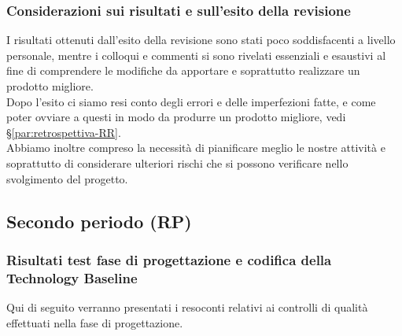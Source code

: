 \documentclass[../piano_di_qualifica.tex]{subfiles}
\begin{document}
\subsubsection{Considerazioni sui risultati e sull’esito della revisione}
I risultati ottenuti dall’esito della revisione sono stati poco soddisfacenti a livello personale, mentre i colloqui e commenti si sono rivelati essenziali e esaustivi al fine di comprendere le modifiche da apportare e soprattutto realizzare un prodotto migliore. \\
Dopo l'esito ci siamo resi conto degli errori e delle imperfezioni fatte, e come poter ovviare a questi in modo da produrre un prodotto migliore, vedi \S\ref{par:retrospettiva-RR}. \\
Abbiamo inoltre compreso la necessità di pianificare meglio le nostre attività e soprattutto di considerare ulteriori rischi che si possono verificare nello svolgimento del progetto.


\subsection{Secondo periodo (RP)}
\label{sub:periodo-RP}
\subsubsection{Risultati test fase di progettazione e codifica della Technology Baseline}
Qui di seguito verranno presentati i resoconti relativi ai controlli di qualità effettuati nella fase di progettazione. \par
\end{document}

